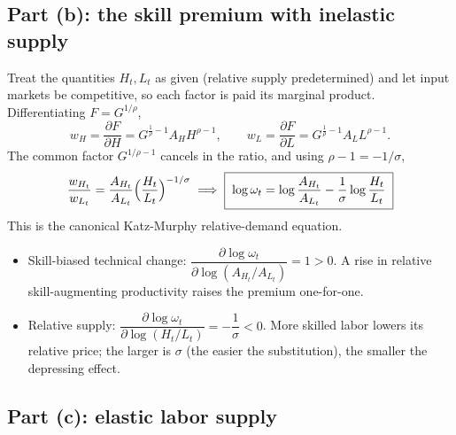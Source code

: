 \documentclass[11pt]{article}
\begin{document}
\subsection*{Part (b): the skill premium with inelastic supply}

Treat the quantities $H_t,L_t$ as given (relative supply predetermined) and let
input markets be competitive, so each factor is paid its marginal product.
Differentiating $F=G^{1/\rho}$,
\[
w_{H}=\frac{\partial F}{\partial H}=G^{\frac1\rho-1}A_{H}H^{\rho-1},
\qquad
w_{L}=\frac{\partial F}{\partial L}=G^{\frac1\rho-1}A_{L}L^{\rho-1}.
\]
The common factor $G^{1/\rho-1}$ cancels in the ratio, and using
$\rho-1=-1/\sigma$,
\begin{equation}
\frac{w_{H_t}}{w_{L_t}}=\frac{A_{H_t}}{A_{L_t}}\Bigl(\frac{H_t}{L_t}\Bigr)^{-1/\sigma}
\;\Longrightarrow\;
\boxed{\;\log\omega_{t}=\log\frac{A_{H_t}}{A_{L_t}}-\frac1\sigma\log\frac{H_t}{L_t}\;}
\end{equation}
This is the canonical Katz-Murphy relative-demand equation.
\begin{itemize}[nosep]
\item Skill-biased technical change:
$\dfrac{\partial\log\omega_t}{\partial\log(A_{H_t}/A_{L_t})}=1>0$. A rise in
relative skill-augmenting productivity raises the premium one-for-one.
\item Relative supply:
$\dfrac{\partial\log\omega_t}{\partial\log(H_t/L_t)}=-\dfrac1\sigma<0$. More
skilled labor lowers its relative price; the larger is $\sigma$ (the easier the
substitution), the smaller the depressing effect.
\end{itemize}

\subsection*{Part (c): elastic labor supply}
\end{document}
